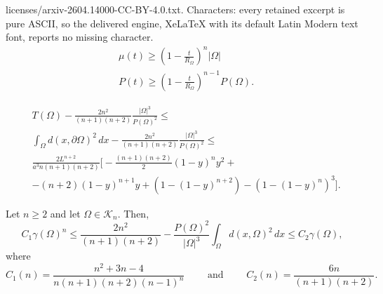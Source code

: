 \documentclass[10pt,a4paper]{amsart}
\newcommand{\abs}[1]{{\left|#1\right|}}
\begin{document}
licenses/arxiv-2604.14000-CC-BY-4.0.txt. Characters: every retained excerpt is pure ASCII, so the delivered engine, XeLaTeX with its default Latin Modern text font, reports no missing character.
\begin{equation}\label{eq:concavity}
\begin{split}
& \mu(t)\ge \left(1-\frac{t}{R_\Omega}\right)^{n}\abs{\Omega}\\
&P(t) \ge \left(1-\frac{t}{R_\Omega}\right)^{n-1} P(\Omega).
  \end{split}  
\end{equation}

\begin{equation}
\label{pointquant}
\begin{split}
    &T(\Omega)-\frac{2n^2}{(n+1)(n+2)}\frac{\abs{\Omega}^3}{P(\Omega)^2}\le\\
    &\int_{\Omega} d(x, \partial \Omega)^2 \, dx-\frac{2n^2}{(n+1)(n+2)}\frac{\abs{\Omega}^3}{P(\Omega)^2}\le\\
    &\frac{2L^{n+2}}{a^3n(n+1)(n+2)}\bigg[-\frac{(n+1)(n+2)}{2}(1-y)^ny^2+\\
    &-(n+2)(1-y)^{n+1}y
    +(1-(1-y)^{n+2})-(1-(1-y)^n)^3\bigg].    
\end{split}
\end{equation}

\begin{prop}\label{prop:quantitative}
    Let $n\ge 2$ and let $\Omega \in \mathcal{K}_n$. Then,
    \begin{equation*}
        C_1\gamma(\Omega)^n\le \frac{2n^2}{(n+1)(n+2)}-\frac{P(\Omega)^2}{\abs{\Omega}^3} \int_{\Omega}d(x,\Omega)^2\, dx\le C_2\gamma(\Omega),
    \end{equation*}
      where
    \begin{equation*}
        C_1(n) = \frac{n^2+3n-4}{n(n+1)(n+2)(n-1)^{n}} \qquad \text{ and } \qquad C_2(n) = \frac{6n}{(n+1)(n+2)}. 
    \end{equation*}
\end{prop}
\end{document}
